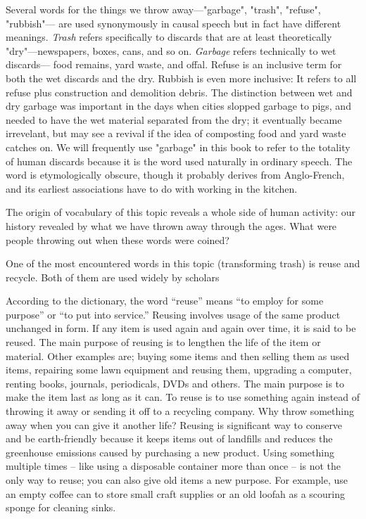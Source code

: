 Several words for the things we throw away---"garbage", "trash", "refuse", "rubbish"--- are used synonymously in causal speech but in fact have different meanings. \textit{Trash} refers specifically to discards that are at least theoretically "dry"---newspapers, boxes, cans, and so on. \textit{Garbage} refers technically to wet discards--- food remains, yard waste, and offal. Refuse is an inclusive term for both the wet discards and the dry. Rubbish is even more inclusive: It refers to all refuse plus construction and demolition debris. The distinction between wet and dry garbage was important in the days when cities slopped garbage to pigs, and needed to have the wet material separated from the dry; it eventually became irrevelant, but may see a revival if the idea of composting food and yard waste catches on. We will frequently use "garbage" in this book to refer to the totality of human discards because it is the word used naturally in ordinary speech. The word is etymologically obscure, though it probably derives from Anglo-French, and its earliest associations have to do with working in the kitchen.

The origin of vocabulary of this topic reveals a whole side of human activity: our history revealed by what we have thrown away through the ages. What were people throwing out when these words were coined? 

One of the most encountered words in this topic (transforming trash) is reuse and recycle. Both of them are used widely by scholars 

According to the dictionary, the word “reuse” means “to employ for some purpose” or “to put into service.” Reusing involves usage of the same product unchanged in form. If any item is used again and again over time, it is said to be reused. The main purpose of reusing is to lengthen the life of the item or material. Other examples are; buying some items and then selling them as used items, repairing some lawn equipment and reusing them, upgrading a computer, renting books, journals, periodicals, DVDs and others. The main purpose is to make the item last as long as it can. To reuse is to use something again instead of throwing it away or sending it off to a recycling company. Why throw something away when you can give it another life? Reusing is significant way to conserve and be earth-friendly because it keeps items out of landfills and reduces the greenhouse emissions caused by purchasing a new product. Using something multiple times -- like using a disposable container more than once -- is not the only way to reuse; you can also give old items a new purpose. For example, use an empty coffee can to store small craft supplies or an old loofah as a scouring sponge for cleaning sinks.

